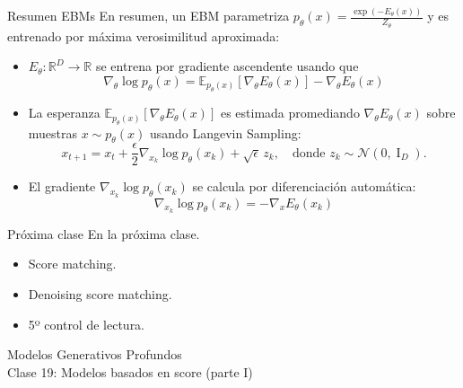 \documentclass{beamer}
\newcommand{\R}{\mathbb{R}}
\begin{document}
\begin{frame}{Resumen EBMs}
    En resumen, un EBM parametriza $p_\theta(x)=\frac{\exp\left(-E_\theta(x)\right)}{Z_\theta}$ y es entrenado por máxima verosimilitud aproximada:
    \begin{itemize}
        \item $E_\theta:\R^D\to\R$ se entrena por gradiente ascendente usando que
              \begin{equation*}
                  \nabla_\theta\log p_\theta(x)=\mathbb{E}_{p_\theta(x)}\left[\nabla_\theta E_\theta(x)\right]-\nabla_\theta E_\theta(x)
              \end{equation*}
        \item La esperanza $\mathbb{E}_{p_\theta(x)}\left[\nabla_\theta E_\theta(x)\right]$ es estimada promediando $\nabla_\theta E_\theta(x)$ sobre muestras $x\sim p_\theta(x)$ usando Langevin Sampling:
              \begin{equation*}
                  x_{t+1} = x_t+\frac{\epsilon}{2} \nabla_{x_k} \log p_\theta(x_k)+\sqrt{\epsilon}\, z_k,
                  \quad\text{donde }
                  z_k\sim\mathcal{N}(0,\operatorname{I}_D).
              \end{equation*}
        \item El gradiente $\nabla_{x_k} \log p_\theta(x_k)$ se calcula por diferenciación automática:
              \begin{equation*}
                  \nabla_{x_k}\log p_\theta(x_k) =-\nabla_xE_\theta(x_k)
              \end{equation*}
    \end{itemize}
\end{frame}

\begin{frame}{Próxima clase}
    En la próxima clase.
    \begin{itemize}
        \item Score matching.
        \item Denoising score matching.
        \item 5º control de lectura.
    \end{itemize}
\end{frame}

\begin{frame}
    \centering
    \Large{Modelos Generativos Profundos}\\
    \large{Clase 19: Modelos basados en score (parte I)}
\end{frame}
\end{document}
